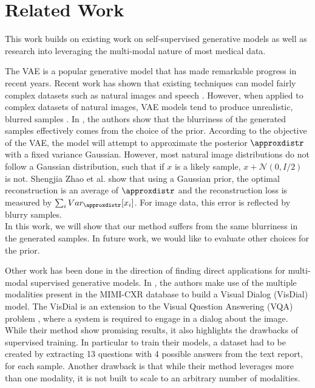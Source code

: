 \section{Related Work}


This work builds on existing work on self-supervised generative models as well as research into leveraging the multi-modal nature of most medical data.

The VAE is a popular generative model that has made remarkable progress in recent years.
Recent work has shown that existing techniques can model fairly complex datasets such as natural images and speech \cite{kingma2015variational, gulrajani2016pixelvae, bowman2015generating}.
However, when applied to complex datasets of natural images, VAE models tend to produce unrealistic, blurred samples \cite{zhao2017towards, dosovitskiy2016generating}.
In \cite{zhao2017towards}, the authors show that the blurriness of the generated samples effectively comes from the choice of the prior.
According to the objective of the VAE, the model will attempt to approximate the posterior $\approxdistr$ with a fixed variance Gaussian.
However, most natural image distributions do not follow a Gaussian distribution, such that if $x$ is a likely sample, $x + \mathcal{N}(0, I/2)$ is not.
Shengjia Zhao et al. \cite{zhao2017towards} show that using a Gaussian prior, the optimal reconstruction is an average of $\approxdistr$ and the reconstruction loss is measured by $\sum _i Var _{\approxdistr} [x_i]$.
For image data, this error is reflected by blurry samples.\\
In this work, we will show that our method suffers from the same blurriness in the generated samples.
In future work, we would like to evaluate other choices for the prior.

Other work has been done in the direction of finding direct applications for multi-modal supervised generative models.
In \cite{kovaleva2020towards}, the authors make use of the multiple modalities present in the MIMI-CXR database \cite{johnson2019mimic} to build a Visual Dialog (VisDial) \cite{das2017visual} model.
The VisDial is an extension to the Visual Question Answering (VQA) problem \cite{antol2015vqa}, where a system is required to engage in a dialog about the image.
While their method show promising results, it also highlights the drawbacks of supervised training.
In particular to train their models, a dataset had to be created by extracting 13 questions with 4 possible answers from the text report, for each sample.
Another drawback is that while their method leverages more than one modality, it is not built to scale to an arbitrary number of modalities.
